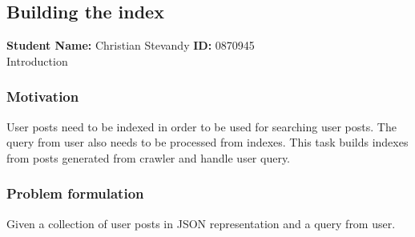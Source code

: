 \subsection{Building the index}
\textbf{Student Name: }Christian Stevandy \textbf{ID:} 0870945\\
Introduction
\subsubsection*{Motivation}
User posts need to be indexed in order to be used for searching user posts. The query from user also needs to be processed from indexes. This task builds indexes from posts generated from crawler and handle user query.
\subsubsection*{Problem formulation}
Given a collection of user posts in JSON representation and a query from user.
